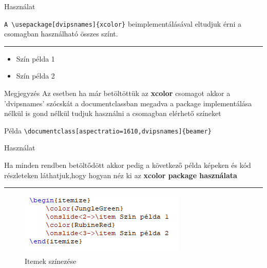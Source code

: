 \documentclass[aspectratio=1610,dvipsnames,xcolor=table]{beamer}
\begin{document}
  
\begin{frame}[fragile]{Használat}
	\begin{center}
	
 		\verb!A \usepackage[dvipsnames]{xcolor}! beimplementálásával eltudjuk 			érni a csomagban használható összes színt.
 		\noindent
		{\color{Dandelion} \rule{\linewidth}{1mm}}
		\end{center}
 			\begin{itemize}
 				\color{JungleGreen}
 				\item Szín példa 1
 				\color{RubineRed}
 				\onslide<3->\item Szín példa 2
 			\end{itemize}

 	\begin{block}{Megjegyzés}
 		Az esetben ha már betöltöttük az \textbf{xcolor} csomagot akkor a 'dvipsnames' 				szócskát a documentclassban megadva a package implementálása nélkül is gond 				nélkül tudjuk használni a csomagban elérhető színeket
	\end{block} 	
	
	\begin{exampleblock}{Példa}
    {
       \verb!\documentclass[aspectratio=1610,dvipsnames]{beamer}!
    }
    \end{exampleblock}
	
	
\end{frame}

\begin{frame}[fragile]{Használat}
\begin{center}
Ha minden rendben betöltődött akkor pedig a következő példa képeken és kód részleteken láthatjuk,hogy hogyan néz ki az \textbf{xcolor package használata}
\noindent
{\color{Dandelion} \rule{\linewidth}{1mm}}
\end{center}
	
	\begin{figure}[H]
			 \includegraphics[scale=0.8]{img/itemszinezes.png}
			 \onslide<2->\caption{Itemek színezése}
	\end{figure}
\end{frame}
\end{document}
